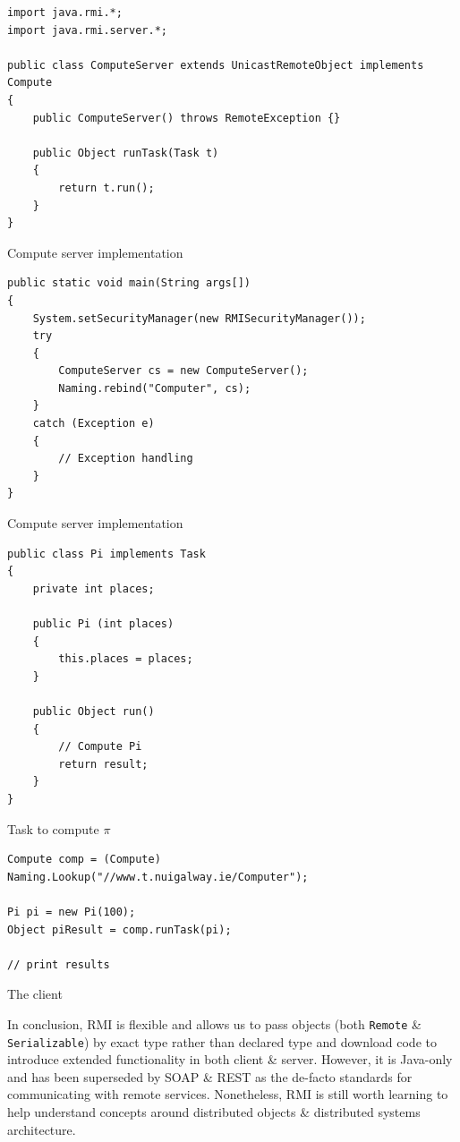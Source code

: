 \documentclass[a4paper,11pt]{article}
\newenvironment{code}{\captionsetup{type=listing}}{}
\begin{document}
\begin{code}
\begin{verbatim}
import java.rmi.*;
import java.rmi.server.*;

public class ComputeServer extends UnicastRemoteObject implements Compute
{
    public ComputeServer() throws RemoteException {}

    public Object runTask(Task t)
    {
        return t.run();
    }
}
\end{verbatim}
\caption{Compute server implementation}
\end{code}

\begin{code}
\begin{verbatim}
public static void main(String args[])
{
    System.setSecurityManager(new RMISecurityManager());
    try
    {
        ComputeServer cs = new ComputeServer();
        Naming.rebind("Computer", cs);
    }
    catch (Exception e)
    {
        // Exception handling
    }
}
\end{verbatim}
\caption{Compute server implementation}
\end{code}

\begin{code}
\begin{verbatim}
public class Pi implements Task
{
    private int places;

    public Pi (int places)
    {
        this.places = places;
    }

    public Object run()
    {
        // Compute Pi
        return result;
    }
}
\end{verbatim}
\caption{Task to compute $\pi$}
\end{code}

\begin{code}
\begin{verbatim}
Compute comp = (Compute) Naming.Lookup("//www.t.nuigalway.ie/Computer");

Pi pi = new Pi(100);
Object piResult = comp.runTask(pi);

// print results
\end{verbatim}
\caption{The client}
\end{code}

In conclusion, RMI is flexible and allows us to pass objects (both \texttt{Remote} \& \texttt{Serializable}) by exact type rather than declared type and download code to introduce extended functionality in both client \& server.
However, it is Java-only and has been superseded by SOAP \& REST as the de-facto standards for communicating with remote services.
Nonetheless, RMI is still worth  learning to help understand concepts around distributed objects \& distributed systems architecture. 
\end{document}

